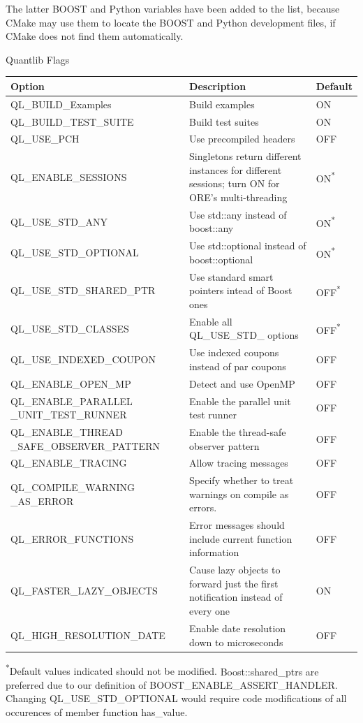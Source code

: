 The latter BOOST and Python variables have been added to the list, because CMake may use them to locate
the BOOST and Python development files, if CMake does not find them automatically.


Quantlib Flags
{\scriptsize
\begin{tabular}{|p{5.5cm}|p{6cm}|p{3cm}|}
    \hline
    Option & Description & Default  \\
    \hline
    \hline
    QL\_BUILD\_Examples & Build examples & ON \\
    \hline
    QL\_BUILD\_TEST\_SUITE & Build test suites  & ON \\
    \hline
    QL\_USE\_PCH & Use precompiled headers & OFF \\
    \hline
    QL\_ENABLE\_SESSIONS & Singletons return different instances for different sessions; turn ON for ORE's multi-threading & ON\textsuperscript{*} \\
    \hline
    QL\_USE\_STD\_ANY & Use std::any instead of boost::any & ON\textsuperscript{*} \\
    \hline
    QL\_USE\_STD\_OPTIONAL & Use std::optional instead of boost::optional & ON\textsuperscript{*} \\
    \hline
    QL\_USE\_STD\_SHARED\_PTR & Use standard smart pointers intead of Boost ones & OFF\textsuperscript{*} \\
    \hline
    QL\_USE\_STD\_CLASSES & Enable all QL\_USE\_STD\_ options & OFF\textsuperscript{*} \\
    \hline
    QL\_USE\_INDEXED\_COUPON & Use indexed coupons instead of par coupons & OFF \\
    \hline
    QL\_ENABLE\_OPEN\_MP & Detect and use OpenMP & OFF \\
    \hline
    QL\_ENABLE\_PARALLEL \_UNIT\_TEST\_RUNNER & Enable the parallel unit test runner & OFF \\
    \hline
    QL\_ENABLE\_THREAD \_SAFE\_OBSERVER\_PATTERN & Enable the thread-safe observer pattern & OFF \\
    \hline
    QL\_ENABLE\_TRACING & Allow tracing messages & OFF \\
    \hline
    QL\_COMPILE\_WARNING \_AS\_ERROR & Specify whether to treat warnings on compile as errors. & OFF \\
    \hline
    QL\_ERROR\_FUNCTIONS & Error messages should include current function information & OFF \\
    \hline
    QL\_FASTER\_LAZY\_OBJECTS & Cause lazy objects to forward just the first notification instead of every one & ON \\
    \hline
    QL\_HIGH\_RESOLUTION\_DATE & Enable date resolution down to microseconds & OFF \\
    \hline

\end{tabular}
}
{\scriptsize{ \textsuperscript{*}Default values indicated should not be modified.}
\scriptsize{ Boost::shared\_ptrs are preferred due to our definition of BOOST\_ENABLE\_ASSERT\_HANDLER. }
\scriptsize{ Changing QL\_USE\_STD\_OPTIONAL would require code modifications of all occurences of member function has\_value.}}


